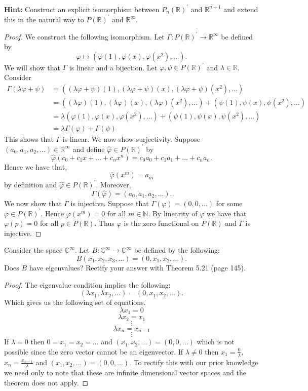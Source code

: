 \documentclass[11pt]{exam}
\theoremstyle{definition}
\begin{document}
\begin{questions}
{\bf Hint: }Construct an explicit isomorphism between $P_n(\mathbb{R})^\prime$ and $\mathbb{R}^{n+1}$ and extend this in the natural way to $P(\mathbb{R})^\prime$ and $\mathbb{R}^\infty$. 
\begin{proof} We construct the following isomorphism. Let $\Gamma: P(\mathbb{R})^\prime\rightarrow \mathbb{R}^\infty$ be defined by 
\[\varphi\mapsto (\varphi(1), \varphi(x), \varphi(x^2), \ldots).\]
We will show that $\Gamma$ is linear and a bijection. Let $\varphi, \psi\in P(\mathbb{R})^\prime$ and $\lambda \in \mathbb{R}$. Consider 
\begin{align*}
\Gamma(\lambda \varphi+\psi)&=((\lambda \varphi+\psi)(1),(\lambda \varphi+\psi)(x),(\lambda \varphi+\psi)(x^2),\ldots)\\
&= ((\lambda \varphi)(1),(\lambda \varphi)(x),(\lambda \varphi)(x^2),\ldots)+(\psi(1),\psi(x),\psi(x^2),\ldots)\\
&= \lambda(\varphi(1),\varphi(x),\varphi(x^2),\ldots)+(\psi(1),\psi(x),\psi(x^2),\ldots)\\
&=\lambda \Gamma(\varphi)+\Gamma(\psi)
\end{align*}
This shows that $\Gamma$ is linear. We now show surjectivity. Suppose $(a_0, a_1,a_2,\ldots)\in \mathbb{R}^\infty$ and define $\hat{\varphi}\in P(\mathbb{R})^\prime$ by 
\[\hat{\varphi}(c_0+c_1x+\ldots+c_nx^n)=c_0a_0+c_1a_1+\ldots +c_na_n.\]
Hence we have that, 
\[\hat{\varphi}(x^m)=a_m\]
by definition and $\hat{\varphi}\in P(\mathbb{R})^\prime$. Moreover, 
\[\Gamma(\hat{\varphi})=(a_0,a_1,a_2,\ldots).\] We now show that $\Gamma$ is injective. Suppose that $\Gamma(\varphi)=(0,0,\ldots)$ for some $\varphi\in P(\mathbb{R})^\prime$. Hence $\varphi(x^m)=0$ for all $m\in \mathbb{N}$. By linearity of $\varphi$ we have that $\varphi(p)=0$ for all $p\in P(\mathbb{R})$. Thus $\varphi$ is the zero functional on $P(\mathbb{R})$ and $\Gamma$ is injective.
\end{proof}
\question Consider the space $\mathbb{C}^\infty$. Let $B:\mathbb{C}^\infty\rightarrow \mathbb{C}^\infty$ be defined by the following:
\[B(x_1, x_2, x_3,\ldots) =(0, x_1, x_2, \ldots).\]
Does $B$ have eigenvalues? Rectify your answer with Theorem 5.21 (page 145).
\begin{proof} The eigenvalue condition implies the following: 
\[(\lambda x_1, \lambda x_2, \ldots)=(0, x_1, x_2,\ldots).\]
Which gives us the following set of equations. 
\[\lambda x_1=0\]
\[\lambda x_2=x_1\]
\[\vdots\]
\[\lambda x_n=x_{n-1}\]
\[\vdots\]
If $\lambda =0$ then $0=x_1=x_2=\ldots$ and $(x_1,x_2,\ldots)=(0,0,\ldots)$ which is not possible since the zero vector cannot be an eigenvector. If $\lambda\neq 0$ then $x_1=\frac{0}{\lambda}$, $x_n=\frac{x_{n-1}}{\lambda}$ and $(x_1,x_2,\ldots)=(0,0,\ldots)$. To rectify this with our prior knowledge we need only to note that these are infinite dimensional vector spaces and the theorem does not apply. 

\end{proof}
\end{questions}
\end{document}
